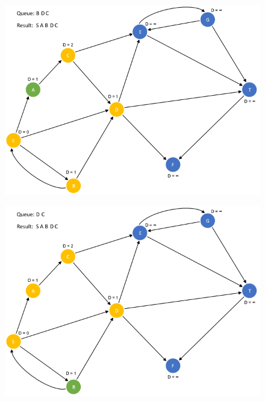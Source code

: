 \documentclass{article}
\begin{document}
\begin{figure}[H]
\centering
\includegraphics[scale=0.6]{images/Q4/06.png}
\end{figure}

\begin{figure}[H]
\centering
\includegraphics[scale=0.6]{images/Q4/07.png}
\end{figure}
\end{document}
